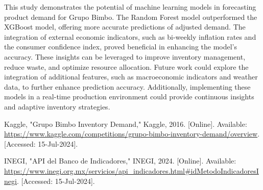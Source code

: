 \documentclass[letterpaper, 10 pt, conference]{ieeeconf}  %
\begin{document}
This study demonstrates the potential of machine learning models in forecasting product demand for Grupo Bimbo. The Random Forest model outperformed the XGBoost model, offering more accurate predictions of adjusted demand. The integration of external economic indicators, such as bi-weekly inflation rates and the consumer confidence index, proved beneficial in enhancing the model's accuracy. These insights can be leveraged to improve inventory management, reduce waste, and optimize resource allocation. Future work could explore the integration of additional features, such as macroeconomic indicators and weather data, to further enhance prediction accuracy. Additionally, implementing these models in a real-time production environment could provide continuous insights and adaptive inventory strategies.

\addtolength{\textheight}{-12cm}   %







\begin{thebibliography}{99}

 Kaggle, "Grupo Bimbo Inventory Demand," Kaggle, 2016. [Online]. Available: \url{https://www.kaggle.com/competitions/grupo-bimbo-inventory-demand/overview}. [Accessed: 15-Jul-2024].

 INEGI, "API del Banco de Indicadores," INEGI, 2024. [Online]. Available: \url{https://www.inegi.org.mx/servicios/api_indicadores.html#idMetodoIndicadoresInegi}. [Accessed: 15-Jul-2024].

\end{thebibliography}
\end{document}
